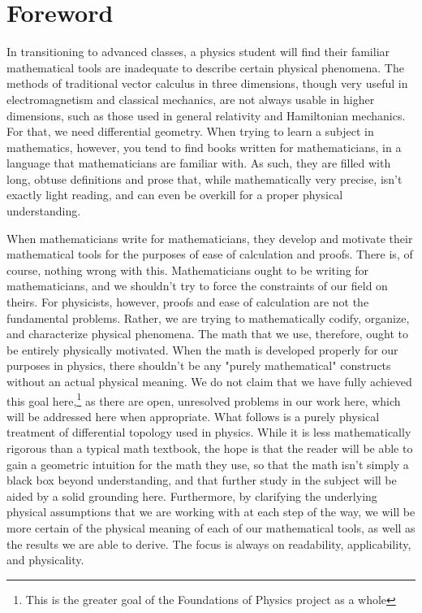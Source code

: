 \documentclass{book}
\begin{document}
\tableofcontents

\clearpage







\section{Foreword}
In transitioning to advanced classes, a physics student will find their familiar mathematical tools are inadequate to describe certain physical phenomena. The methods of traditional vector calculus in three dimensions, though very useful in electromagnetism and classical mechanics, are not always usable in higher dimensions, such as those used in general relativity and Hamiltonian mechanics. For that, we need differential geometry. When trying to learn a subject in mathematics, however, you tend to find books written for mathematicians, in a language that mathematicians are familiar with. As such, they are filled with long, obtuse definitions and prose that, while mathematically very precise, isn't exactly light reading, and can even be overkill for a proper physical understanding. 

When mathematicians write for mathematicians, they develop and motivate their mathematical tools for the purposes of ease of calculation and proofs. There is, of course, nothing wrong with this. Mathematicians ought to be writing for mathematicians, and we shouldn't try to force the constraints of our field on theirs. For physicists, however, proofs and ease of calculation are not the fundamental problems. Rather, we are trying to mathematically codify, organize, and characterize physical phenomena. The math that we use, therefore, ought to be entirely physically motivated. When the math is developed properly for our purposes in physics, there shouldn't be any "purely mathematical" constructs without an actual physical meaning. We do not claim that we have fully achieved this goal here,\footnote{This is the greater goal of the Foundations of Physics project as a whole} as there are open, unresolved problems in our work here, which will be addressed here when appropriate. 
What follows is a purely physical treatment of differential topology used in physics. While it is less mathematically rigorous than a typical math textbook, the hope is that the reader will be able to gain a geometric intuition for the math they use, so that the math isn't simply a black box beyond understanding, and that further study in the subject will be aided by a solid grounding here. Furthermore, by clarifying the underlying physical assumptions that we are working with at each step of the way, we will be more certain of the physical meaning of each of our mathematical tools, as well as the results we are able to derive.  The focus is always on readability, applicability, and physicality.
\end{document}
